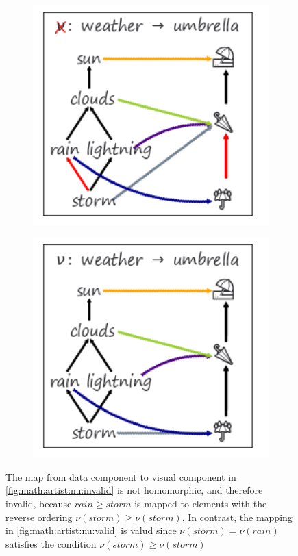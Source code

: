 \documentclass[../main.tex]{subfiles}
\begin{document}
\begin{figure}[htb]
  \centering
  \begin{subfigure}{.49\textwidth}
    \includegraphics[width=1\textwidth]{figures/math/partial_invalid.png}
    \caption{}
    \label{fig:math:artist:nu:invalid}
  \end{subfigure}
  \begin{subfigure}{.49\textwidth}
    \includegraphics[width=1\textwidth]{figures/math/partial_fixed.png}
    \caption{}
    \label{fig:math:artist:nu:valid}
  \end{subfigure}
  \caption{The map from data component to visual component in \autoref{fig:math:artist:nu:invalid} is not homomorphic, and therefore invalid, because $rain \geq storm$ is mapped to elements with the reverse ordering $\nu(storm) \geq \nu(storm)$. In contrast, the mapping in \autoref{fig:math:artist:nu:valid} is valud since $\nu(storm)=\nu(rain)$ satisfies the condition $\nu(storm) \geq \nu(storm)$}
  \label{fig:math:artist:nu}
\end{figure}
\end{document}
